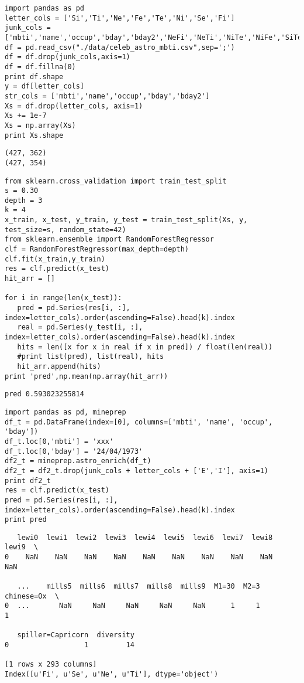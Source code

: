 \documentclass[12pt,fleqn]{article}\usepackage{../common}
\begin{document}
\begin{verbatim}
import pandas as pd
letter_cols = ['Si','Ti','Ne','Fe','Te','Ni','Se','Fi']
junk_cols = ['mbti','name','occup','bday','bday2','NeFi','NeTi','NiTe','NiFe','SiTe','SiFe','SeFi','SeTi']
df = pd.read_csv("./data/celeb_astro_mbti.csv",sep=';')
df = df.drop(junk_cols,axis=1)
df = df.fillna(0)
print df.shape
y = df[letter_cols]
str_cols = ['mbti','name','occup','bday','bday2']
Xs = df.drop(letter_cols, axis=1)
Xs += 1e-7
Xs = np.array(Xs)
print Xs.shape
\end{verbatim}

\begin{verbatim}
(427, 362)
(427, 354)
\end{verbatim}


\begin{verbatim}
from sklearn.cross_validation import train_test_split
s = 0.30
depth = 3
k = 4
x_train, x_test, y_train, y_test = train_test_split(Xs, y, test_size=s, random_state=42)
from sklearn.ensemble import RandomForestRegressor
clf = RandomForestRegressor(max_depth=depth)
clf.fit(x_train,y_train)
res = clf.predict(x_test)
hit_arr = []

for i in range(len(x_test)):
   pred = pd.Series(res[i, :], index=letter_cols).order(ascending=False).head(k).index    
   real = pd.Series(y_test[i, :], index=letter_cols).order(ascending=False).head(k).index    
   hits = len([x for x in real if x in pred]) / float(len(real))
   #print list(pred), list(real), hits
   hit_arr.append(hits)
print 'pred',np.mean(np.array(hit_arr))
\end{verbatim}

\begin{verbatim}
pred 0.593023255814
\end{verbatim}

\begin{verbatim}
import pandas as pd, mineprep
df_t = pd.DataFrame(index=[0], columns=['mbti', 'name', 'occup', 'bday'])
df_t.loc[0,'mbti'] = 'xxx'
df_t.loc[0,'bday'] = '24/04/1973'
df2_t = mineprep.astro_enrich(df_t)
df2_t = df2_t.drop(junk_cols + letter_cols + ['E','I'], axis=1)
print df2_t
res = clf.predict(x_test)
pred = pd.Series(res[i, :], index=letter_cols).order(ascending=False).head(k).index    
print pred
\end{verbatim}

\begin{verbatim}
   lewi0  lewi1  lewi2  lewi3  lewi4  lewi5  lewi6  lewi7  lewi8  lewi9  \
0    NaN    NaN    NaN    NaN    NaN    NaN    NaN    NaN    NaN    NaN   

   ...    mills5  mills6  mills7  mills8  mills9  M1=30  M2=3  chinese=Ox  \
0  ...       NaN     NaN     NaN     NaN     NaN      1     1           1   

   spiller=Capricorn  diversity  
0                  1         14  

[1 rows x 293 columns]
Index([u'Fi', u'Se', u'Ne', u'Ti'], dtype='object')
\end{verbatim}
\end{document}
